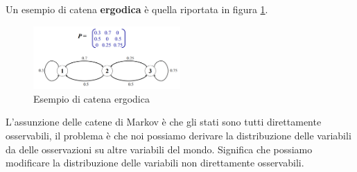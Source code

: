 \begin{esempio}
    Un esempio di catena \textbf{ergodica} è quella riportata in figura \ref{fig:ergodic}.
    \begin{figure}[!ht]
        \centering
        \includegraphics[width=0.5\textwidth]{img/catene/catena_ergodica.png}
        \caption{Esempio di catena ergodica}
        \label{fig:ergodic}
    \end{figure}
\end{esempio}

L'assunzione delle catene di Markov è che gli stati sono tutti direttamente osservabili,
il problema è che noi possiamo derivare la distribuzione delle variabili da delle
osservazioni su altre variabili del mondo. Significa che possiamo modificare la
distribuzione delle variabili non direttamente osservabili.
